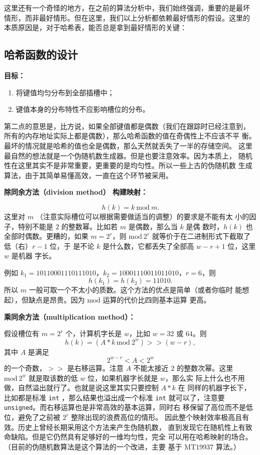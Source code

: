\documentclass[a4paper]{ctexart}
\theoremstyle{definition}
\theoremstyle{definition}
\begin{document}
这里还有一个奇怪的地方，在之前的算法分析中，我们始终强调，重要的是最坏
情形，而非最好情形。但在这里，我们以上分析都依赖最好情形的假设。这里的
本质原因是，对于哈希表，能否总是拿到最好情形的关键：

\subsection{哈希函数的设计}

{\bf 目标：} 

\begin{enumerate}
\item 将键值均匀分布到全部插槽中；
\item 键值本身的分布特性不应影响槽位的分布。
\end{enumerate}

第二点的意思是，比方说，如果全部键值都是偶数（我们在跟踪时已经注意到，
  所有的内存地址实际上都是偶数），那么哈希函数的值在奇偶性上不应该不平
衡。最坏的情况就是哈希的值也全是偶数，那么天然就丢失了一半的存储空间。
这里最自然的想法就是一个伪随机数生成器。但是也要注意效率。因为本质上，
随机性在这里其实不是非常重要，更重要的是均匀性。所以一些上古的伪随机数
生成算法，由于其简单易懂高效，一直在这个环节被采用。

{\bf 除同余方法（division method） 构建映射：}

$$
h(k) = k ~\mathrm{mod}~ m.
$$
这里对 $m$ （注意实际槽位可以根据需要做适当的调整）的要求是不能有太
小的因子，特别不能是 $2$ 的整数幂。比如若 $m$ 是偶数，那么当 $k$ 是偶
数时，$h(k)$ 也全部时偶数。更糟的，如果 $m = 2^r$，则
$\mathrm{mod}~2^r$ 就等价于在二进制形式下截取了低（右）$r - 1$ 位，于
是不论 $k$ 是什么数，它都丢失了全部高 $w - r + 1$ 位，这里 $w$ 是机器
字长。

例如 $k_1 = 10110001110111010$，$k_2 = 10001110011011010$，$r =
6$，则
$$
h(k_1) = h(k_2) = 11010.
$$
所以 $m$ 一般可取一个不太小的质数。这个方法的优点是简单（或者你临时
  能想起），但缺点是昂贵。因为 $\mathrm{mod}$ 运算的代价比四则基本运算
更高。

{\bf 乘同余方法（multiplication method）：}

假设槽位有 $m = 2^r$ 个，计算机字长是 $w$，比如 $w = 32$ 或 $64$。则
$$
h(k) = (A * k ~\mathrm{mod} ~2^w) >> (w - r),
$$
其中 $A$ 是满足
$$
2^{w - r} < A < 2^w
$$
的一个奇数，$>>$ 是右移运算。注意 $A$ 不能太接近 $2$ 的整数次幂。这里
$\mathrm{mod}~2^w$ 就是取该数的低 $w$ 位，如果机器字长就是 $w$，那么实
际上什么也不用做，自然溢出就行了。也就是说这里其实只要控制 $A * k$ 在
同样的机器字长下，比如都是标准 \verb|int| ，那么结果也溢出成一个标准 \verb|int|
就可以了，注意要 \verb|unsigned|。而右移运算也是非常高效的基本运算，同时右
移保留了高位而不是低位，避免了之前被 $2^r$ 整除出现的浪费高位的情形。
因此整个映射效率极高且有效。历史上曾经长期采用这个方法来产生伪随机数，
直到发现它在随机性上有致命缺陷。但是它仍然具有足够好的一维均匀性，完全
可以用在哈希映射的场合。（目前的伪随机数算法是这个算法的一个改进，主要
  基于 MT19937 算法。）
\end{document}
